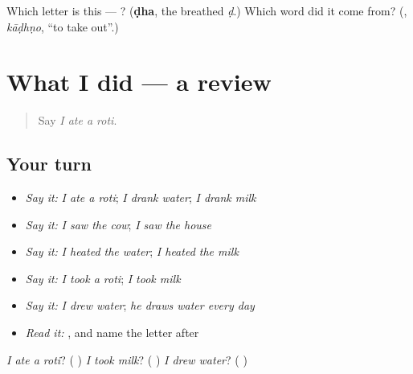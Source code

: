 \begin{tcolorbox}[breakable,colback=teal!4,colframe=teal!35!black,title={Before you move on}]
Which letter is this — ? (\textbf{ḍha}, the breathed \emph{ḍ}.) Which word did it come from? (\textbf{}, \emph{kāḍhṇo}, \textquotedblleft{}to take out\textquotedblright{}.)
\end{tcolorbox}
\section[(dialogue)]{What I did — a review}

\label{lesson:MW-R161-what-i-did}



\begin{quote}
Say \emph{I ate a roti}.
\end{quote}

\subsection*{Your turn}
\begin{itemize}
\raggedright
  \item \emph{Say it:} \emph{I ate a roti}; \emph{I drank water}; \emph{I drank milk}
  \item \emph{Say it:} \emph{I saw the cow}; \emph{I saw the house}
  \item \emph{Say it:} \emph{I heated the water}; \emph{I heated the milk}
  \item \emph{Say it:} \emph{I took a roti}; \emph{I took milk}
  \item \emph{Say it:} \emph{I drew water}; \emph{he draws water every day}
  \item \emph{Read it:} \textbf{}, and name the letter after \textbf{}
\end{itemize}

\begin{tcolorbox}[breakable,colback=teal!4,colframe=teal!35!black,title={Before you move on}]
\emph{I ate a roti}? (\textbf{  }) \emph{I took milk}? (\textbf{  }) \emph{I drew water}? (\textbf{  })
\end{tcolorbox}
